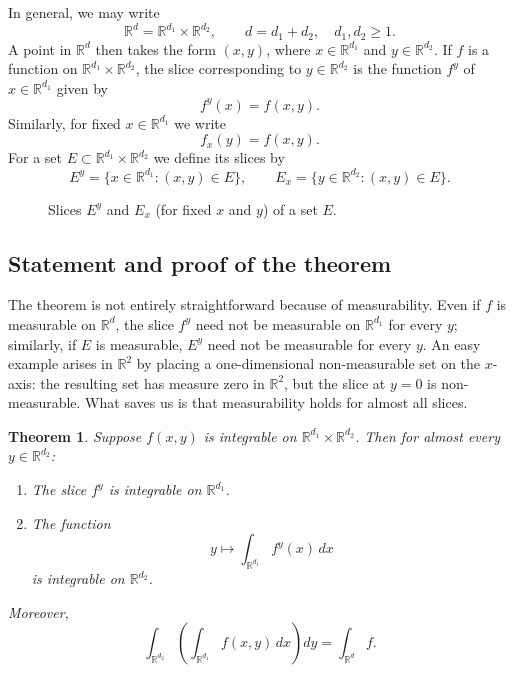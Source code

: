 \documentclass[11pt,openany]{book}
\newtheorem{theorem}{Theorem}[section]
\begin{document}
In general, we may write
\[
\mathbb{R}^d=\mathbb{R}^{d_1}\times\mathbb{R}^{d_2},
\qquad d=d_1+d_2,\quad d_1,d_2\geq1.
\]
A point in $\mathbb{R}^d$ then takes the form $(x,y)$, where $x\in\mathbb{R}^{d_1}$ and $y\in\mathbb{R}^{d_2}$. If $f$ is a function on $\mathbb{R}^{d_1}\times\mathbb{R}^{d_2}$, the slice corresponding to $y\in\mathbb{R}^{d_2}$ is the function $f^y$ of $x\in\mathbb{R}^{d_1}$ given by
\[
f^y(x)=f(x,y).
\]
Similarly, for fixed $x\in\mathbb{R}^{d_1}$ we write
\[
f_x(y)=f(x,y).
\]
For a set $E\subset\mathbb{R}^{d_1}\times\mathbb{R}^{d_2}$ we define its slices by
\[
E^y=\{x\in\mathbb{R}^{d_1}:(x,y)\in E\},
\qquad
E_x=\{y\in\mathbb{R}^{d_2}:(x,y)\in E\}.
\]

\begin{figure}[ht]
\centering
{}
\caption{Slices $E^y$ and $E_x$ (for fixed $x$ and $y$) of a set $E$.}
\end{figure}

\subsection{Statement and proof of the theorem}

The theorem is not entirely straightforward because of measurability. Even if $f$ is measurable on $\mathbb{R}^d$, the slice $f^y$ need not be measurable on $\mathbb{R}^{d_1}$ for every $y$; similarly, if $E$ is measurable, $E^y$ need not be measurable for every $y$. An easy example arises in $\mathbb{R}^2$ by placing a one-dimensional non-measurable set on the $x$-axis: the resulting set has measure zero in $\mathbb{R}^2$, but the slice at $y=0$ is non-measurable. What saves us is that measurability holds for almost all slices.

\begin{theorem}
Suppose $f(x,y)$ is integrable on $\mathbb{R}^{d_1}\times\mathbb{R}^{d_2}$. Then for almost every $y\in\mathbb{R}^{d_2}$:
\begin{enumerate}
\item[(i)] The slice $f^y$ is integrable on $\mathbb{R}^{d_1}$.
\item[(ii)] The function
\[
y\longmapsto\int_{\mathbb{R}^{d_1}}f^y(x)\,dx
\]
is integrable on $\mathbb{R}^{d_2}$.
\end{enumerate}
Moreover,
\[
\int_{\mathbb{R}^{d_2}}
\left(\int_{\mathbb{R}^{d_1}}f(x,y)\,dx\right)dy
=\int_{\mathbb{R}^d}f.
\]
\end{theorem}
\end{document}
